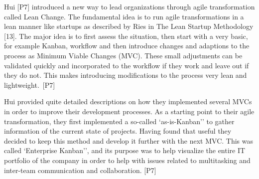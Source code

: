 Hui [P7] introduced a new way to lead organizations through agile
transformation called Lean Change. The fundamental idea is to run agile
transformations in a lean manner like startups as described by Ries in
The Lean Startup Methodology [13]. The major idea is to first assess the
situation, then start with a very basic, for example Kanban, workflow
and then introduce changes and adaptions to the process as Minimum
Viable Changes (MVC). These small adjustments can be validated quickly
and incorporated to the workflow if they work and leave out if they do
not. This makes introducing modifications to the process very lean and
lightweight. [P7]

Hui provided quite detailed descriptions on how they implemented several
MVCs in order to improve their development processes. As a starting
point to their agile transformation, they first implemented a so-called
`as-is-Kanban'' to gather information of the current state of projects.
Having found that useful they decided to keep this method and develop it
further with the next MVC\@. This was called `Enterprise Kanban'', and
its purpose was to help visualize the entire IT portfolio of the company
in order to help with issues related to multitasking and inter-team
communication and collaboration. [P7]
